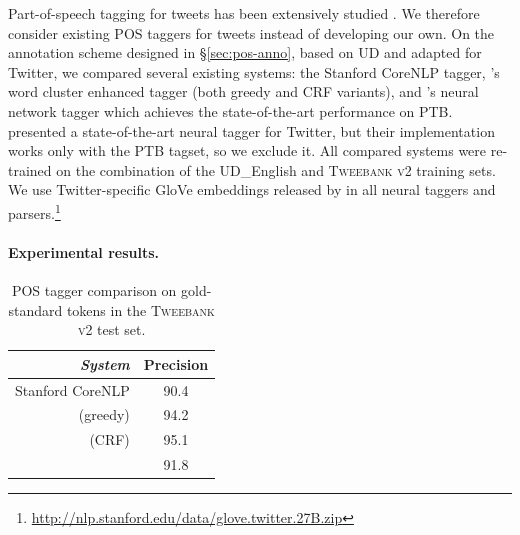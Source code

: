 \documentclass[11pt,a4paper]{article}
\newcommand{\yjcomment}[1]{\textcolor{orange}{[$_\mathrm{L}^\mathrm{Y}$#1]}}
\begin{document}
Part-of-speech tagging for tweets has been extensively studied \cite{ritter-EtAl:2011:EMNLP,gimpel-EtAl:2011:ACL-HLT2011,derczynski-EtAl:2013:RANLP-2013,owoputi-EtAl:2013:NAACL-HLT,gui-EtAl:2017:EMNLP20172}. We therefore consider existing POS taggers for tweets instead of developing our own.
On the annotation scheme designed in \S\ref{sec:pos-anno}, based on UD and adapted for
Twitter, we compared several existing systems: the Stanford CoreNLP tagger, 
\citet{owoputi-EtAl:2013:NAACL-HLT}'s word cluster enhanced tagger
(both greedy and CRF variants), and 
\citet{ma-hovy:2016:P16-1}'s neural network tagger 
which achieves the state-of-the-art performance on PTB.
\citet{gui-EtAl:2017:EMNLP20172} presented a state-of-the-art neural tagger for Twitter,
but their implementation works only with the PTB tagset, so we exclude
it. %
All compared systems were re-trained on the combination of the UD\_English and 
\textsc{Tweebank v2} training sets. We use Twitter-specific GloVe embeddings released by
\citet{pennington-socher-manning:2014:EMNLP2014} in all neural taggers
and parsers.\footnote{\url{http://nlp.stanford.edu/data/glove.twitter.27B.zip}}


\paragraph{Experimental results.}

\begin{table}[t]
	\centering
	\begin{tabular}{rc}
		\hline
		\it System & Precision \\
		\hline
		Stanford CoreNLP & 90.4 \\
		\citealp{owoputi-EtAl:2013:NAACL-HLT} (greedy) & 94.2 \\
		\citealp{owoputi-EtAl:2013:NAACL-HLT} (CRF) & 95.1 \\
		\hdashline
		\citealp{ma-hovy:2016:P16-1} & 91.8 \\
		\hline
	\end{tabular}
	\caption{POS tagger comparison on gold-standard tokens in the
          \textsc{Tweebank v2} test set. \label{tbl:pos-result}}
\end{table}
\end{document}
